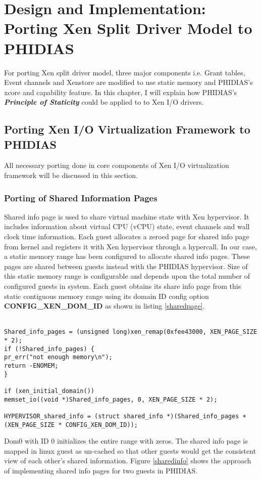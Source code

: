 \chapter{Design and Implementation: Porting Xen Split Driver Model to PHIDIAS\label{cha:chapter5}}
For porting Xen split driver model, three major components i.e. Grant tables, Event channels and Xenstore are modified to use static memory and PHIDIAS's xcore and capability feature. In this chapter, I will explain how PHIDIAS's \textit{\textbf{Principle of Staticity}} could be applied to to Xen I/O drivers.

\section{Porting Xen I/O Virtualization Framework to PHIDIAS\label{sec:memstatic}}
All necessary porting done in core components of Xen I/O virtualization framework will be discussed in this section.

\subsection{Porting of Shared Information Pages\label{sec:sharedinfo}}
Shared info page is used to share virtual machine state with Xen hypervisor. It includes information about virtual CPU (vCPU) state, event channels and wall clock time information. Each guest allocates a zeroed page for shared info page from kernel and registers it with Xen hypervisor through a hypercall. In our case, a static memory range has been configured to allocate shared info pages. These pages are shared between guests instead with the PHIDIAS hypervisor. Size of this static memory range is configurable and depends upon the total number of configured guests in system. Each guest obtains its share info page from this static contiguous memory range using its domain ID config option \textbf{CONFIG\_XEN\_DOM\_ID} as shown in listing \ref{sharedpage}. \\
\\
\begin{lstlisting}[caption=Guest mapping its shared information page on PHIDIAS, label={sharedpage}]
Shared_info_pages = (unsigned long)xen_remap(0xfee43000, XEN_PAGE_SIZE * 2);
if (!Shared_info_pages) {
pr_err("not enough memory\n");
return -ENOMEM;
}

if (xen_initial_domain())
memset_io((void *)Shared_info_pages, 0, XEN_PAGE_SIZE * 2);	

HYPERVISOR_shared_info = (struct shared_info *)(Shared_info_pages + (XEN_PAGE_SIZE * CONFIG_XEN_DOM_ID));
\end{lstlisting}
Dom0 with ID 0 initializes the entire range with zeros. The shared info page is mapped in linux guest as un-cached so that other guests would get the consistent view of each other's shared information. Figure \ref{sharedinfo} shows the approach of implementing shared info pages for two guests in PHIDIAS.
\\


